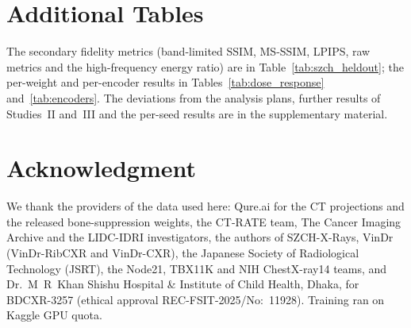 \appendices
\section{Additional Tables}
\label{app:extra}
The secondary fidelity metrics (band-limited SSIM, MS-SSIM, LPIPS, raw metrics and the high-frequency energy ratio) are in
Table~\ref{tab:szch_heldout}; the per-weight and per-encoder results in Tables~\ref{tab:dose_response} and~\ref{tab:encoders}. The
deviations from the analysis plans, further results of Studies~II and~III and the per-seed results are in the supplementary material.

\begin{table}[!t]
\centering
\caption{Single-seed results of the final models. The ensembles average seeds 0 to 2; SwinV2-T seed 3 is the reserve.}
\label{tab:app_seeds}
\end{table}

\begin{table}[!t]
\centering
\caption{Exact-truth audit on the Qure-projection test split (430 projections; lesions added to the soft component): absorption, lesion
contrast ratio of the soft estimate and bone MAE. The SwinV2-T twin row averages the four seeds of the dose-response arm ($K=4$); the other
trained models use seeds 0--2.}
\label{tab:app_qp}
\end{table}

\begin{table}[!t]
\centering
\caption{Audit amplitude sweep on the 450 SZCH sites (development data, models of 27 October 2026).}
\label{tab:app_amplitude}
\end{table}

\begin{table}[!t]
\centering
\caption{Encoder screen at \num{100000} samples, twin weight 16 (development data, rule R1).}
\label{tab:app_screen}
\end{table}

\clearpage   %
\section*{Acknowledgment}
We thank the providers of the data used here: Qure.ai for the CT projections and the released bone-suppression weights, the CT-RATE team,
The Cancer Imaging Archive and the LIDC-IDRI investigators, the authors of SZCH-X-Rays, VinDr (VinDr-RibCXR and VinDr-CXR), the Japanese
Society of Radiological Technology (JSRT), the Node21, TBX11K and NIH ChestX-ray14 teams, and Dr.~M~R~Khan Shishu Hospital \& Institute of
Child Health, Dhaka, for BDCXR-3257 (ethical approval REC-FSIT-2025/No:~11928). Training ran on Kaggle GPU quota. 

